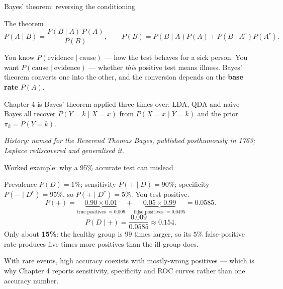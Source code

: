 \documentclass[aspectratio=169,11pt]{beamer}
\begin{document}
\begin{frame}{Bayes' theorem: reversing the conditioning}
  \begin{block}{The theorem}
    \[
      P(A \mid B) = \frac{P(B \mid A)\,P(A)}{P(B)},
      \qquad
      P(B) = P(B \mid A)P(A) + P(B \mid A^c)P(A^c).
    \]
  \end{block}
  \begin{readme}
    You know $P(\text{evidence} \mid \text{cause})$ --- how the test behaves
    for a sick person. You want $P(\text{cause} \mid \text{evidence})$ ---
    whether \emph{this} positive test means illness. Bayes' theorem
    converts one into the other, and the conversion depends on the
    \textbf{base rate} $P(A)$.
  \end{readme}
  \begin{takeaway}
    Chapter 4 is Bayes' theorem applied three times over: LDA, QDA and naive
    Bayes all recover
    $P(Y=k \mid X=x)$ from $P(X = x\mid Y=k)$ and the prior $\pi_k = P(Y=k)$.
  \end{takeaway}
  \par{\tiny\itshape\color{gray}History: named for the Reverend Thomas Bayes,
  published posthumously in 1763; Laplace rediscovered and generalised it.}
\end{frame}

\begin{frame}{Worked example: why a 95\% accurate test can mislead}\label{frm:screening}
  \footnotesize
  \begin{numexample}
    Prevalence $P(D) = 1\%$; sensitivity $P(+ \mid D) = 90\%$; specificity
    $P(- \mid D^c) = 95\%$, so $P(+ \mid D^c) = 5\%$. You test positive.
    \[
      P(+) = \underbrace{0.90 \times 0.01}_{\text{true positives } = 0.009}
           + \underbrace{0.05 \times 0.99}_{\text{false positives } = 0.0495}
           = 0.0585 .
    \]
    \[
      P(D \mid +) = \frac{0.009}{0.0585} \approx 0.154 .
    \]
    Only about \textbf{15\%}: the healthy group is $99$ times larger, so its
    $5\%$ false-positive rate produces five times more positives than the ill
    group does.
  \end{numexample}
  \begin{takeaway}
    With rare events, high accuracy coexists with mostly-wrong positives ---
    which is why Chapter 4 reports sensitivity, specificity and ROC curves
    rather than one accuracy number.
  \end{takeaway}
\end{frame}
\end{document}
